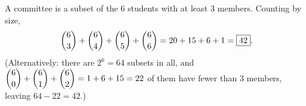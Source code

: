 A committee is a subset of the $6$ students with at least $3$ members. Counting by size,
\[
\dbinom63+\dbinom64+\dbinom65+\dbinom66=20+15+6+1=\boxed{42}.
\]
(Alternatively: there are $2^6=64$ subsets in all, and $\dbinom60+\dbinom61+\dbinom62=1+6+15=22$ of them have fewer than $3$ members, leaving $64-22=42$.)
